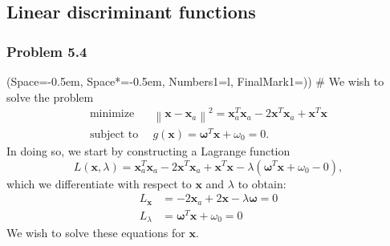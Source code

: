 \documentclass[12pt, a4paper]{article}
\newcommand{\listSpace}{-0.5em}%
\newcommand{\vect}[1]{\bm{#1}}
\newcommand{\norm}[1]{\left\lVert#1\right\rVert}
\begin{document}
\clearpage
\subsection{Linear discriminant functions}

\subsubsection*{Problem 5.4}
\begin{easylist}[enumerate]
	\ListProperties(Space=\listSpace, Space*=\listSpace, Numbers1=l, FinalMark1={)})
	# We wish to solve the problem
	\begin{align*}
		\operatorname{minimize} \, & \norm{\vect{x} - \vect{x}_a}^2 =
		\vect{x}_a^T \vect{x}_a - 2\vect{x}^T \vect{x}_a + \vect{x}^T \vect{x} \\
		\text{subject to } \, & g(\vect{x}) = \vect{\omega}^T \vect{x} + \omega_0 = 0.
	\end{align*}
	In doing so, we start by constructing a Lagrange function
	\begin{equation*}
		L(\vect{x}, \lambda) = \vect{x}_a^T \vect{x}_a - 2\vect{x}^T \vect{x}_a + \vect{x}^T \vect{x} - \lambda( \vect{\omega}^T \vect{x} + \omega_0 - 0 ),
	\end{equation*}
	which we differentiate with respect to $\vect{x}$ and $\lambda$ to obtain:
	\begin{align*}
		L_{\vect{x}} &= -2 \vect{x}_a + 2 \vect{x} - \lambda \vect{\omega} = 0 \\
		L_\lambda &= \vect{\omega}^T \vect{x} + \omega_0 = 0
	\end{align*}
	We wish to solve these equations for $\vect{x}$.
	

\end{easylist}
\end{document}
